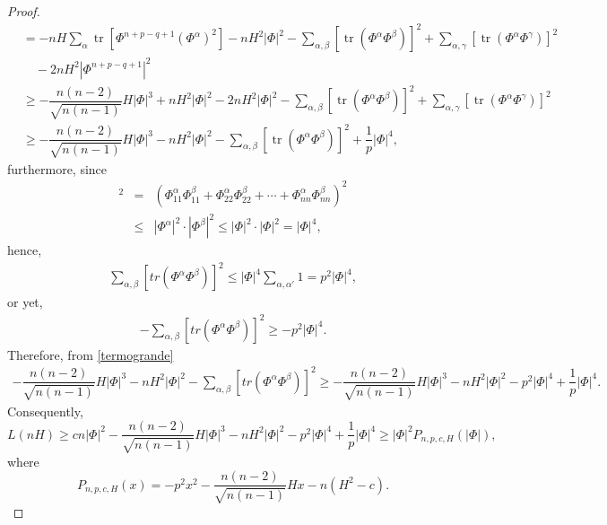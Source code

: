 \documentclass[10pt,a4paper]{amsart}
\begin{document}
\begin{proof}
\begin{align}
&= -nH\sum_{\alpha}\operatorname{tr}[\Phi^{n+p-q+1}(\Phi^{\alpha})^2]
     -nH^2|\Phi|^2
     -\sum_{\alpha,\beta}[\operatorname{tr}(\Phi^{\alpha}\Phi^{\beta})]^2
     +\sum_{\alpha,\gamma}[\operatorname{tr}(\Phi^{\alpha}\Phi^{\gamma})]^2 \nonumber \\
&\quad -2nH^2|\Phi^{n+p-q+1}|^2 \nonumber \\[4pt]
&\geq -\dfrac{n(n-2)}{\sqrt{n(n-1)}}H|\Phi|^3
      +nH^2|\Phi|^2
      -2nH^2|\Phi|^2
      -\sum_{\alpha,\beta}[\operatorname{tr}(\Phi^{\alpha}\Phi^{\beta})]^2
      +\sum_{\alpha,\gamma}[\operatorname{tr}(\Phi^{\alpha}\Phi^{\gamma})]^2 \\[4pt]
&\geq -\dfrac{n(n-2)}{\sqrt{n(n-1)}}H|\Phi|^3
      -nH^2|\Phi|^2
      -\sum_{\alpha,\beta}[\operatorname{tr}(\Phi^{\alpha}\Phi^{\beta})]^2
      +\dfrac{1}{p}|\Phi|^4, \nonumber
\end{align}
furthermore, since
\begin{eqnarray*}
[tr(\Phi^{\alpha}\Phi^{\beta})]^2&=&(\Phi_{11}^{\alpha}\Phi_{11}^{\beta}+\Phi_{22}^{\alpha}\Phi_{22}^{\beta}+\cdots+\Phi_{nn}^{\alpha}\Phi_{nn}^{\beta})^2\\
&\leq&|\Phi^{\alpha}|^2\cdot |\Phi^{\beta}|^2\leq |\Phi|^2\cdot |\Phi|^2=|\Phi|^4,
\end{eqnarray*}
hence,
\begin{eqnarray*}
\sum_{\alpha,\beta}[tr(\Phi^{\alpha}\Phi^{\beta})]^2\leq |\Phi|^4\sum_{\alpha,\alpha'}1=p^2|\Phi|^4,
\end{eqnarray*}
or yet, 
\begin{eqnarray*}
-\sum_{\alpha,\beta}[tr(\Phi^{\alpha}\Phi^{\beta})]^2\geq -p^2|\Phi|^4.
\end{eqnarray*}
Therefore, from \eqref{termogrande}
\begin{eqnarray*}
-\dfrac{n(n-2)}{\sqrt{n(n-1)}}H|\Phi|^3-nH^2|\Phi|^2-\sum_{\alpha,\beta}[tr(\Phi^{\alpha}\Phi^{\beta})]^2\geq -\dfrac{n(n-2)}{\sqrt{n(n-1)}}H|\Phi|^3-nH^2|\Phi|^2-p^2|\Phi|^4+\dfrac{1}{p}|\Phi|^4.
\end{eqnarray*}
Consequently,
\begin{equation}\label{4.7}
L(nH)\geq cn|\Phi|^2-\dfrac{n(n-2)}{\sqrt{n(n-1)}}H|\Phi|^3-nH^2|\Phi|^2-p^2|\Phi|^4+\dfrac{1}{p}|\Phi|^4
\geq |\Phi|^2P_{n,p,c,H}(|\Phi|),
\end{equation}
where
\begin{equation}
P_{n,p,c,H}(x)=-p^2x^2-\dfrac{n(n-2)}{\sqrt{n(n-1)}}Hx-n(H^2-c).
\end{equation}

\end{proof}
\end{document}
